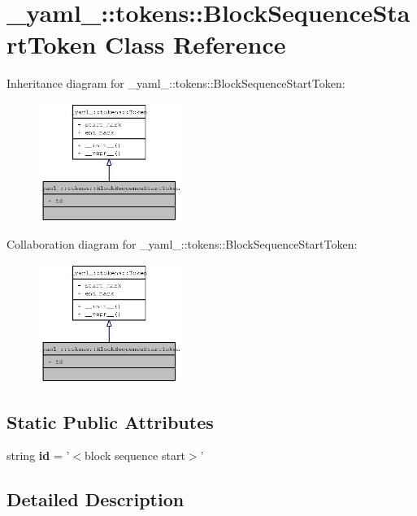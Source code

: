 \section{\_\-yaml\_\-::tokens::BlockSequenceStartToken Class Reference}
\label{class__yaml___1_1tokens_1_1BlockSequenceStartToken}
Inheritance diagram for \_\-yaml\_\-::tokens::BlockSequenceStartToken:\nopagebreak
\begin{figure}[H]
\begin{center}
\leavevmode
\includegraphics[width=131pt]{class__yaml___1_1tokens_1_1BlockSequenceStartToken__inherit__graph}
\end{center}
\end{figure}
Collaboration diagram for \_\-yaml\_\-::tokens::BlockSequenceStartToken:\nopagebreak
\begin{figure}[H]
\begin{center}
\leavevmode
\includegraphics[width=131pt]{class__yaml___1_1tokens_1_1BlockSequenceStartToken__coll__graph}
\end{center}
\end{figure}
\subsection*{Static Public Attributes}
\begin{CompactItemize}
\item 
string {\bf id} = '$<$block sequence start$>$'
\end{CompactItemize}


\subsection{Detailed Description}


